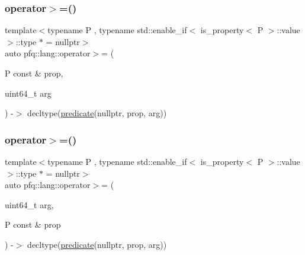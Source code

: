 \subsubsection{\texorpdfstring{operator$>$=()}{operator>=()}\hspace{0.1cm}{\footnotesize\ttfamily [1/2]}}
{\footnotesize\ttfamily template$<$typename P , typename std\+::enable\+\_\+if$<$ is\+\_\+property$<$ P $>$\+::value $>$\+::type $\ast$  = nullptr$>$ \\
auto pfq\+::lang\+::operator$>$= (\begin{DoxyParamCaption}\item[{P const \&}]{prop,  }\item[{uint64\+\_\+t}]{arg }\end{DoxyParamCaption}) -\/$>$ decltype(\hyperlink{namespacepfq_1_1lang_aca9adafc436b7f851621b979fa1aaf88}{predicate}(nullptr, prop, arg))
    \hspace{0.3cm}{\ttfamily [inline]}}

\mbox{\label{namespacepfq_1_1lang_a8a51f8f94279b3b4c7c3e2b52a89470c}} 
\subsubsection{\texorpdfstring{operator$>$=()}{operator>=()}\hspace{0.1cm}{\footnotesize\ttfamily [2/2]}}
{\footnotesize\ttfamily template$<$typename P , typename std\+::enable\+\_\+if$<$ is\+\_\+property$<$ P $>$\+::value $>$\+::type $\ast$  = nullptr$>$ \\
auto pfq\+::lang\+::operator$>$= (\begin{DoxyParamCaption}\item[{uint64\+\_\+t}]{arg,  }\item[{P const \&}]{prop }\end{DoxyParamCaption}) -\/$>$ decltype(\hyperlink{namespacepfq_1_1lang_aca9adafc436b7f851621b979fa1aaf88}{predicate}(nullptr, prop, arg))
    \hspace{0.3cm}{\ttfamily [inline]}}

\mbox{\label{namespacepfq_1_1lang_a7572c906145bed1281a8c4ce8c8eff79}} 

